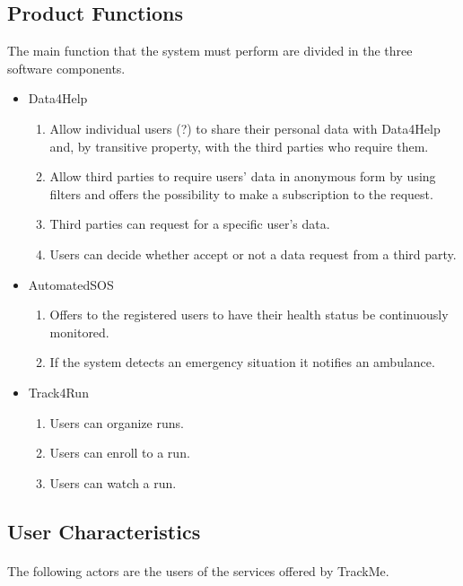 \documentclass[a4paper]{article}
\begin{document}
    
    \subsection{Product Functions}
    The main function that the system must perform are divided in the three software components.
    \begin{itemize}
        \item Data4Help
        \begin{enumerate}
            \item Allow individual users (?) to share their personal data with Data4Help and, by transitive property, with the third parties who require them.
            \item Allow third parties to require users' data in anonymous form by using filters and offers the possibility to make a subscription to the request.
            \item Third parties can request for a specific user's data.
            \item Users can decide whether accept or not a data request from a third party.
        \end{enumerate}
        \item AutomatedSOS
        \begin{enumerate}
            \item Offers to the registered users to have their health status be continuously monitored.
            \item If the system detects an emergency situation it notifies an ambulance.
        \end{enumerate}
        \item Track4Run
        \begin{enumerate}
            \item Users can organize runs.
            \item Users can enroll to a run.
            \item Users can watch a run.
        \end{enumerate}
    \end{itemize}
    
    
    \subsection{User Characteristics}
    
    \paragraph{}The following actors are the users of the services offered by TrackMe. 
    
\end{document}
